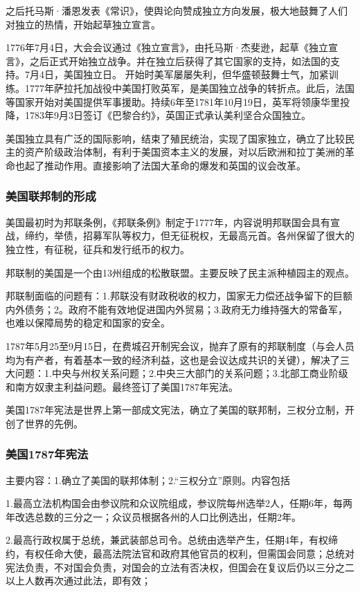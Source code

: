 之后托马斯·潘恩发表《常识》，使舆论向赞成独立方向发展，极大地鼓舞了人们对独立的热情，开始起草独立宣言。

1776年7月4日，大会会议通过《独立宣言》，由托马斯·杰斐逊，起草《独立宣言》，之后正式开始独立战争。并在独立后获得了其它国家的支持，如法国的支持。7月4日，美国独立日。
开始时美军屡屡失利，但华盛顿鼓舞士气，加紧训练。1777年萨拉托加战役中美国打败英军，是美国独立战争的转折点。此后，法国等国家开始对美国提供军事援助。持续6年至1781年10月19日，英军将领康华里投降，1783年9月3日签订《巴黎合约》，英国正式承认美利坚合众国独立。

美国独立具有广泛的国际影响，结束了殖民统治，实现了国家独立，确立了比较民主的资产阶级政治体制，有利于美国资本主义的发展，对以后欧洲和拉丁美洲的革命也起了推动作用。直接影响了法国大革命的爆发和英国的议会改革。

\subsubsection{美国联邦制的形成}
美国最初时为邦联条例，《邦联条例》制定于1777年，内容说明邦联国会具有宣战，缔约，举债，招募军队等权力，但无征税权，无最高元首。各州保留了很大的独立性，有征税，征兵和发行纸币的权力。

邦联制的美国是一个由13州组成的松散联盟。主要反映了民主派种植园主的观点。

邦联制面临的问题有：1.邦联没有财政税收的权力，国家无力偿还战争留下的巨额内外债务；2。政府不能有效地促进国内外贸易；3.政府无力维持强大的常备军，也难以保障局势的稳定和国家的安全。

1787年5月25至9月15日，在费城召开制宪会议，抛弃了原有的邦联制度（与会人员均为有产者，有着基本一致的经济利益，这也是会议达成共识的关键），解决了三大问题：1.中央与州权关系问题；2.中央三大部门的关系问题；3.北部工商业阶级和南方奴隶主利益问题。最终签订了美国1787年宪法。

美国1787年宪法是世界上第一部成文宪法，确立了美国的联邦制，三权分立制，开创了世界的先例。

\subsubsection{美国1787年宪法}
主要内容：1.确立了美国的联邦体制；2.“三权分立”原则。内容包括

1.最高立法机构国会由参议院和众议院组成，参议院每州选举2人，任期6年，每两年改选总数的三分之一；众议员根据各州的人口比例选出，任期2年。

2.最高行政权属于总统，兼武装部总司令。总统由选举产生，任期4年，有权缔约，有权任命大使，最高法院法官和政府其他官员的权利，但需国会同意；总统对宪法负责，不对国会负责，对国会的立法有否决权，但国会在复议后仍以三分之二以上人数再次通过此法，即有效；


